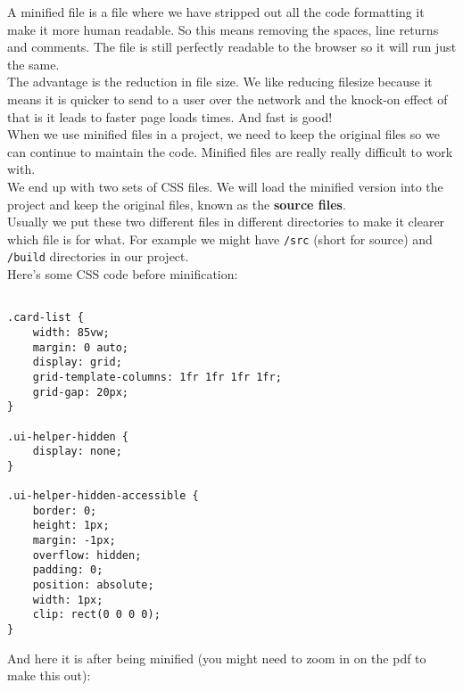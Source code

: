 A minified file is a file where we have stripped out all the code formatting it make it more human readable. So this means removing the spaces, line returns and comments. The file is still perfectly readable to the browser so it will run just the same.
\\

The advantage is the reduction in file size. We like reducing filesize because it means it is quicker to send to a user over the network and the knock-on effect of that is it leads to faster page loads times. And fast is good!
\\

When we use minified files in a project, we need to keep the original files so we can continue to maintain the code. Minified files are really really difficult to work with.
\\

We end up with two sets of CSS files. We will load the minified version into the project and keep the original files, known as the \textbf{source files}.
\\

Usually we put these two different files in different directories to make it clearer which file is for what. For example we might have \texttt{/src} (short for source) and \texttt{/build} directories in our project.
\\


Here's some CSS code before minification:
\\

	\begin{verbatim}

.card-list {
    width: 85vw;
    margin: 0 auto;
    display: grid;
    grid-template-columns: 1fr 1fr 1fr 1fr;
    grid-gap: 20px;
}

.ui-helper-hidden {
    display: none;
}

.ui-helper-hidden-accessible {
    border: 0;
    height: 1px;
    margin: -1px;
    overflow: hidden;
    padding: 0;
    position: absolute;
    width: 1px;
    clip: rect(0 0 0 0);
}

	\end{verbatim}

And here it is after being minified (you might need to zoom in on the pdf to make this out):
\\




